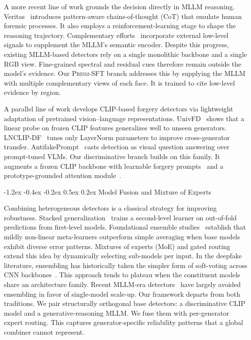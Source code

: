 \documentclass[10pt,twocolumn,letterpaper]{article}
\makeatletter
\renewcommand\subsection{\@startsection{subsection}{2}{\z@}%
  {-1.2ex \@plus -0.4ex \@minus -0.2ex}%
  {0.5ex \@plus 0.2ex}%
  {\normalfont\normalsize\bfseries}}
\newcommand{\prism}{\textsc{Prism-SFT}}
\makeatother
\begin{document}
A more recent line of work grounds the decision directly in MLLM reasoning. Veritas~\cite{veritas} introduces pattern-aware chains-of-thought (CoT) that emulate human forensic processes. It also employs a reinforcement-learning stage to shape the reasoning trajectory. Complementary efforts~\cite{fakeshield,m2f2det} incorporate external low-level signals to supplement the MLLM's semantic encoder. Despite this progress, existing MLLM-based detectors rely on a single monolithic backbone and a single RGB view. Fine-grained spectral and residual cues therefore remain outside the model's evidence. Our \prism{} branch addresses this by supplying the MLLM with multiple complementary views of each face. It is trained to cite low-level evidence by region.

A parallel line of work develops CLIP-based forgery detectors via lightweight adaptation of pretrained vision--language representations. UnivFD~\cite{univfd} shows that a linear probe on frozen CLIP features generalizes well to unseen generators. LNCLIP-DF~\cite{lnclipdf} tunes only LayerNorm parameters to improve cross-generator transfer. AntifakePrompt~\cite{antifakeprompt} casts detection as visual question answering over prompt-tuned VLMs. Our discriminative branch builds on this family. It augments a frozen CLIP backbone with learnable forgery prompts~\cite{vpt} and a prototype-grounded attention module~\cite{protopnet,tesnet}.

\subsection{Model Fusion and Mixture of Experts}

Combining heterogeneous detectors is a classical strategy for improving robustness. Stacked generalization~\cite{wolpert1992stacked} trains a second-level learner on out-of-fold predictions from first-level models. Foundational ensemble studies~\cite{caruana2004ensemble,caruana2006empirical} establish that mildly non-linear meta-learners outperform simple averaging when base models exhibit diverse error patterns. Mixtures of experts (MoE) and gated routing~\cite{moe} extend this idea by dynamically selecting sub-models per input. In the deepfake literature, ensembling has historically taken the simpler form of soft-voting across CNN backbones~\cite{dfdc_winners}. This approach tends to plateau when the constituent models share an architecture family. Recent MLLM-era detectors~\cite{veritas,fakeshield} have largely avoided ensembling in favor of single-model scale-up. Our framework departs from both traditions. We pair structurally orthogonal base detectors: a discriminative CLIP model and a generative-reasoning MLLM. We fuse them with per-generator expert routing. This captures generator-specific reliability patterns that a global combiner cannot represent.
\end{document}
